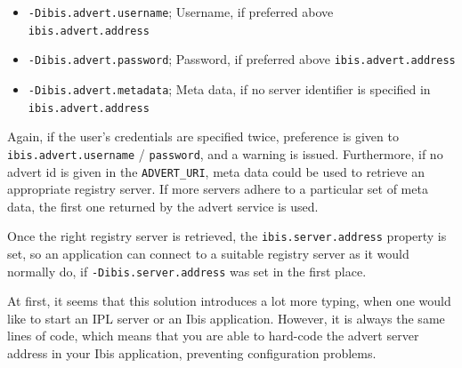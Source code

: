 \begin{itemize}
  \item \texttt{-Dibis.advert.username}; Username, if preferred above
  	\texttt{ibis.advert.address}
  \item \texttt{-Dibis.advert.password}; Password, if preferred above
  	\texttt{ibis.advert.address} 
  \item \texttt{-Dibis.advert.metadata}; Meta data, if no server identifier is
  	specified in \newline \texttt{ibis.advert.address}
\end{itemize}

Again, if the user's credentials are specified twice, preference is given to
\texttt{ibis.advert.username} / \texttt{password}, and a warning is issued.
Furthermore, if no advert id is given in the \texttt{ADVERT\_URI}, meta data
could be used to retrieve an appropriate registry server. If more servers
adhere to a particular set of meta data, the first one returned by the advert
service is used.

Once the right registry server is retrieved, the \texttt{ibis.server.address}
property is set, so an application can connect to a suitable registry server as
it would normally do, if \texttt{-Dibis.server.address} was set in the first
place.

At first, it seems that this solution introduces a lot more typing, when one
would like to start an IPL server or an Ibis application. However, it is always
the same lines of code, which means that you are able to hard-code the advert
server address in your Ibis application, preventing configuration problems.
